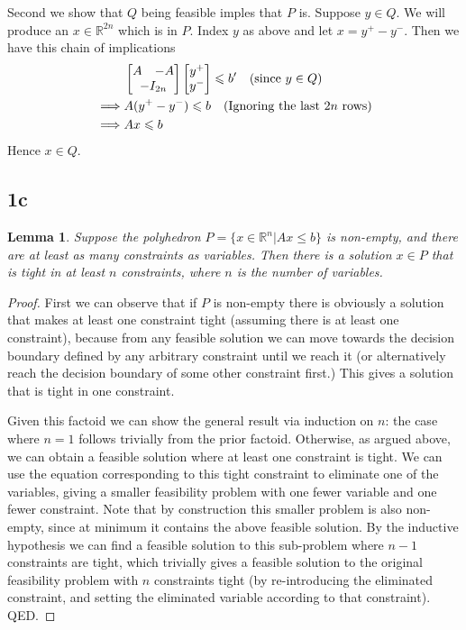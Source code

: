 \documentclass{article}
\newtheorem{lemma}{Lemma}
\begin{document}
Second we show that $Q$ being feasible imples that $P$ is. Suppose $y\in Q$. We will produce an $x \in \mathbb{R}^{2n}$ which is in $P$. Index $y$ as above and let $x = y^+ - y^-$. Then we have this chain of implications
\begin{align*}
&\begin{bmatrix} A & -A \\ \multicolumn{2}{c}{-I_{2n}} \end{bmatrix} \begin{bmatrix} y^+ \\ y^- \end{bmatrix} \leqslant b' \quad \text{(since $y \in Q$)}\\
\implies & A(y^+ - y^-) \leqslant b \quad \text{(Ignoring the last $2n$ rows)}\\
\implies & Ax \leqslant b
\end{align*}
Hence $x \in Q$.

\subsection*{1c}

\begin{lemma}
  Suppose the polyhedron $P = \{x \in \mathbb{R}^n | Ax \leq b\}$ is non-empty,
  and there are at least as many constraints as variables. Then
  there is a solution $x \in P$ that is tight in at least $n$
  constraints, where $n$ is the number of variables.
\end{lemma}
\begin{proof}
  First we can observe that if $P$ is non-empty there is obviously
  a solution that makes at least one constraint tight (assuming there
  is at least one constraint), because from any feasible solution we
  can move towards the decision boundary defined by any arbitrary
  constraint until we reach it (or alternatively reach the decision
  boundary of some other constraint first.) This gives a
  solution that is tight in one constraint.

  Given this factoid we can show the general result via induction
  on $n$: the case where $n = 1$ follows trivially from the prior
  factoid. Otherwise, as argued above, we can obtain a feasible
  solution where at least one constraint is tight. We can use
  the equation corresponding to this tight constraint to eliminate
  one of the variables, giving a smaller feasibility problem with
  one fewer variable and one fewer constraint. Note that by
  construction this smaller problem is also non-empty, since at minimum
  it contains the above feasible solution. By the inductive hypothesis
  we can find a feasible solution to this sub-problem where $n - 1$
  constraints are tight, which trivially gives a feasible solution
  to the original feasibility problem with $n$ constraints tight
  (by re-introducing the eliminated constraint, and setting the
  eliminated variable according to that constraint). QED.
\end{proof}
\end{document}
